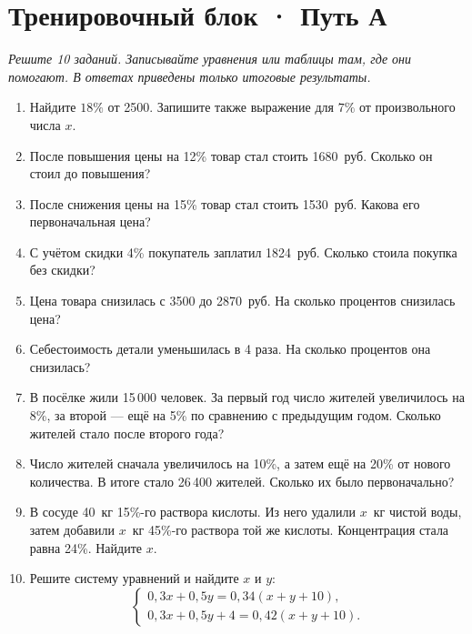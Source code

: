 \documentclass[a4paper,12pt]{article}
\begin{document}
\section*{Тренировочный блок · Путь А}
\textit{Решите 10 заданий. Записывайте уравнения или таблицы там, где они помогают. В ответах приведены только итоговые результаты.}
\vspace{2mm}
\begin{enumerate}[label=\textbf{\arabic*.},itemsep=1.05em]
\item Найдите \(18\%\) от 2500. Запишите также выражение для \(7\%\) от произвольного числа \(x\).
\item После повышения цены на 12\% товар стал стоить 1680~руб. Сколько он стоил до повышения?
\item После снижения цены на 15\% товар стал стоить 1530~руб. Какова его первоначальная цена?
\item С учётом скидки 4\% покупатель заплатил 1824~руб. Сколько стоила покупка без скидки?
\item Цена товара снизилась с 3500 до 2870~руб. На сколько процентов снизилась цена?
\item Себестоимость детали уменьшилась в 4 раза. На сколько процентов она снизилась?
\item В посёлке жили 15\,000 человек. За первый год число жителей увеличилось на 8\%, за второй --- ещё на 5\% по сравнению с предыдущим годом. Сколько жителей стало после второго года?
\item Число жителей сначала увеличилось на 10\%, а затем ещё на 20\% от нового количества. В итоге стало 26\,400 жителей. Сколько их было первоначально?
\item В сосуде 40~кг 15\%-го раствора кислоты. Из него удалили \(x\)~кг чистой воды, затем добавили \(x\)~кг 45\%-го раствора той же кислоты. Концентрация стала равна 24\%. Найдите \(x\).
\item Решите систему уравнений и найдите \(x\) и \(y\):
\[
\begin{cases}
0{,}3x+0{,}5y=0{,}34(x+y+10),\\
0{,}3x+0{,}5y+4=0{,}42(x+y+10).
\end{cases}
\]
\end{enumerate}

\clearpage
\end{document}
